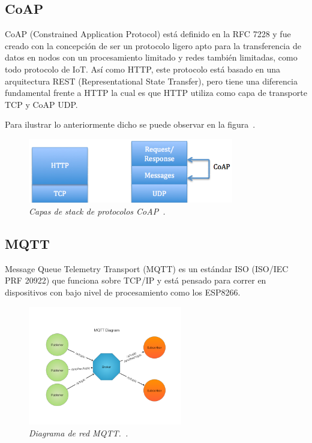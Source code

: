 \subsection{CoAP}

CoAP (Constrained Application Protocol) está definido en la RFC 7228 y fue creado con la concepción de ser un protocolo ligero apto para la transferencia de datos en nodos con un procesamiento limitado y redes también limitadas, como todo protocolo de IoT. Así como HTTP, este protocolo está basado en una arquitectura REST (Representational State Transfer), pero tiene una diferencia fundamental frente a HTTP la cual es que HTTP utiliza como capa de transporte TCP y CoAP UDP. 

Para ilustrar lo anteriormente dicho se puede observar en la figura~.

\begin{figure}[h!]
  \centering
  \includegraphics[width=0.8\textwidth, keepaspectratio]{images/http-coap}
  \caption{\textit{Capas de stack de protocolos CoAP~\cite{HTTP_CoAP_img}.}}
  \label{fig:http_coap}
\end{figure}

\subsection{MQTT}

Message Queue Telemetry Transport (MQTT) es un estándar ISO (ISO/IEC PRF 20922) que funciona sobre TCP/IP y está pensado para correr en dispositivos con bajo nivel de procesamiento como los ESP8266. 

\begin{figure}[h!]
  \centering
  \includegraphics[width=0.6\textwidth, keepaspectratio]{images/mqtt-diagram}
  \caption{\textit{Diagrama de red MQTT.~\cite{MQTT_img}.}}
  \label{fig:mqtt-diag}
\end{figure}

